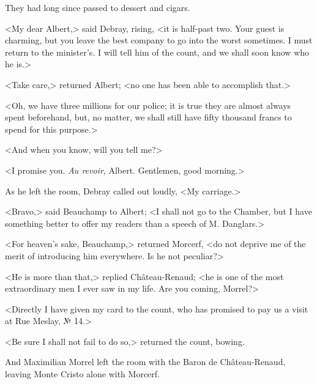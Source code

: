  They had long since passed to dessert and cigars. 

 <My dear Albert,> said Debray, rising, <it is half-past two. Your guest is charming, but you leave the best company to go into the worst sometimes. I must return to the minister's. I will tell him of the count, and we shall soon know who he is.> 

 <Take care,> returned Albert; <no one has been able to accomplish that.> 

 <Oh, we have three millions for our police; it is true they are almost always spent beforehand, but, no matter, we shall still have fifty thousand francs to spend for this purpose.> 

 <And when you know, will you tell me?> 

 <I promise you. \textit{Au revoir}, Albert. Gentlemen, good morning.> 

 As he left the room, Debray called out loudly, <My carriage.> 

 <Bravo,> said Beauchamp to Albert; <I shall not go to the Chamber, but I have something better to offer my readers than a speech of M. Danglars.> 

 <For heaven's sake, Beauchamp,> returned Morcerf, <do not deprive me of the merit of introducing him everywhere. Is he not peculiar?> 

 <He is more than that,> replied Château-Renaud; <he is one of the most extraordinary men I ever saw in my life. Are you coming, Morrel?> 

 <Directly I have given my card to the count, who has promised to pay us a visit at Rue Meslay, № 14.> 

 <Be sure I shall not fail to do so,> returned the count, bowing. 

 And Maximilian Morrel left the room with the Baron de Château-Renaud, leaving Monte Cristo alone with Morcerf. 